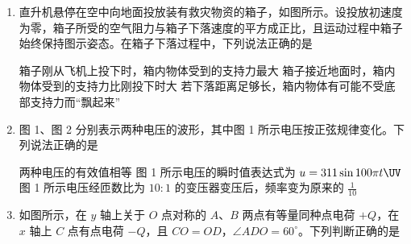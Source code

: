 \documentclass[\gkver]{gaokaozhenti}
\begin{document}
\begin{enumerate}
{离地面高度一定，相对地面静止}
{绕地球运行的角速度比月球绕地球运行的角速度大}
{向心加速度与静止在赤道上物体的向心加速度大小相等}


\item
直升机悬停在空中向地面投放装有救灾物资的箱子，如图所示。设投放初速度为零，箱子所受的空气阻力与箱子下落速度的平方成正比，且运动过程中箱子始终保持图示姿态。在箱子下落过程中，下列说法正确的是


{箱子刚从飞机上投下时，箱内物体受到的支持力最大}
{箱子接近地面时，箱内物体受到的支持力比刚投下时大}
{若下落距离足够长，箱内物体有可能不受底部支持力而“飘起来”}


\item
图 1、图 2 分别表示两种电压的波形，其中图 1 所示电压按正弦规律变化。下列说法正确的是


{两种电压的有效值相等}
{图 1 所示电压的瞬时值表达式为 $u=311\sin100\pi t\UV$}
{图 1 所示电压经匝数比为 $10:1$ 的变压器变压后，频率变为原来的 $\frac{1}{10}$}


\item
如图所示，在 $y$ 轴上关于 $O$ 点对称的 $A$、$B$ 两点有等量同种点电荷 $+Q$，在 $x$ 轴上 $C$ 点有点电荷 $-Q$，且 $CO=OD$，$\angle ADO=60^{\circ}$。下列判断正确的是


\end{enumerate}
\end{document}
